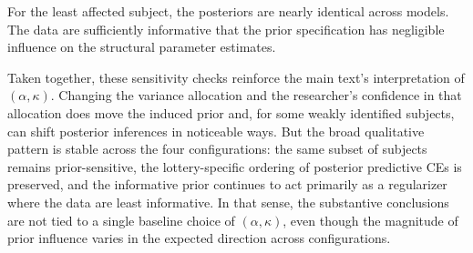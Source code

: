 For the least affected subject, the posteriors are nearly identical across
models. The data are sufficiently informative that the prior specification has
negligible influence on the structural parameter estimates.

Taken together, these sensitivity checks reinforce the main text's
interpretation of $(\alpha, \kappa)$. Changing the variance allocation and the
researcher's confidence in that allocation does move the induced prior and, for
some weakly identified subjects, can shift posterior inferences in noticeable
ways. But the broad qualitative pattern is stable across the four
configurations: the same subset of subjects remains prior-sensitive, the
lottery-specific ordering of posterior predictive CEs is preserved, and the
informative prior continues to act primarily as a regularizer where the data are
least informative. In that sense, the substantive conclusions are not tied to a
single baseline choice of $(\alpha, \kappa)$, even though the magnitude of prior
influence varies in the expected direction across configurations.
